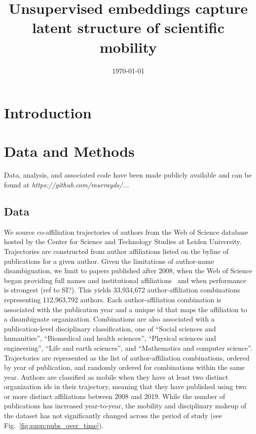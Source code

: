 \documentclass[12pt]{article} %
\begin{document}

\title{Unsupervised embeddings capture latent structure of scientific mobility} %
\date{\today}
\maketitle %

\section{Introduction}\label{sec:introduction} %



%
%
\section{Data and Methods}
\label{sec:datamethods} %

Data, analysis, and associated code have been made publicly available and can be found at \textit{https://github.com/murrayds/...}


\subsection*{Data}
We source co-affiliation trajectories of authors from the Web of Science database hosted by the Center for Science and Technology Studies at Leiden University. 
Trajectories are constructed from author affiliations listed on the byline of publications for a given author.
Given the limitations of author-name disambiguation, we limit to papers published after 2008, when the Web of Science began providing full names and institutional affiliations~\cite{caron2014disambiguation} and when performance is strongest (ref to SI?). 
This yields 33,934,672 author-affiliation combinations representing 112,963,792 authors. 
Each author-affiliation combination is associated with the publication year and a unique id that maps the affiliation to a disambiguate organization. 
Combinations are also associated with a publication-level disciplinary classification, one of ``Social sciences and humanities'',
``Biomedical and health sciences'', ``Physical sciences and engineering'', ``Life and earth sciences'', and ``Mathematics and computer science''.
Trajectories are represented as the list of author-affiliation combinations, ordered by year of publication, and randomly ordered for combinations within the same year. 
Authors are classified as mobile when they have at least two distinct organization ids in their trajectory, meaning that they have published using two or more distinct affiliations between 2008 and 2019.
While the number of publications has increased year-to-year, the mobility and disciplinary makeup of the dataset has not significantly changed across the period of study (see Fig.~\ref{fig:supp:pubs_over_time}).
\end{document}

